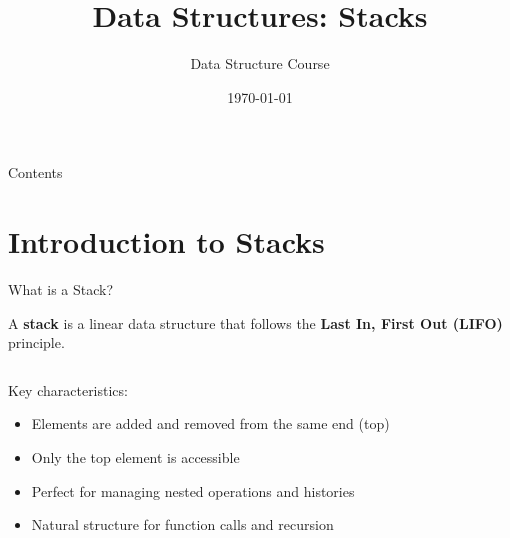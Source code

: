 \documentclass[aspectratio=169,xcolor=dvipsnames]{beamer}
\title[Stacks]{Data Structures: Stacks}
\author{Data Structure Course}
\institute{DGIST}
\date{\today}
\begin{document}
\begin{frame}[plain]
  \titlepage
\end{frame}

\begin{frame}[plain]{Contents}
  \tableofcontents
\end{frame}

\section{Introduction to Stacks}

\begin{frame}{What is a Stack?}
  \begin{definition}
    A \textbf{stack} is a linear data structure that follows the \textbf{Last In, First Out (LIFO)} principle.
  \end{definition}
  
  \vspace{0.5cm}
  
  \begin{columns}
    \begin{column}{0.6\textwidth}
      Key characteristics:
      \begin{itemize}
        \item Elements are added and removed from the same end (top)
        \item Only the top element is accessible
        \item Perfect for managing nested operations and histories
        \item Natural structure for function calls and recursion
      \end{itemize}
    \end{column}
    \begin{column}{0.35\textwidth}
    \end{column}
  \end{columns}
\end{frame}
\end{document}
